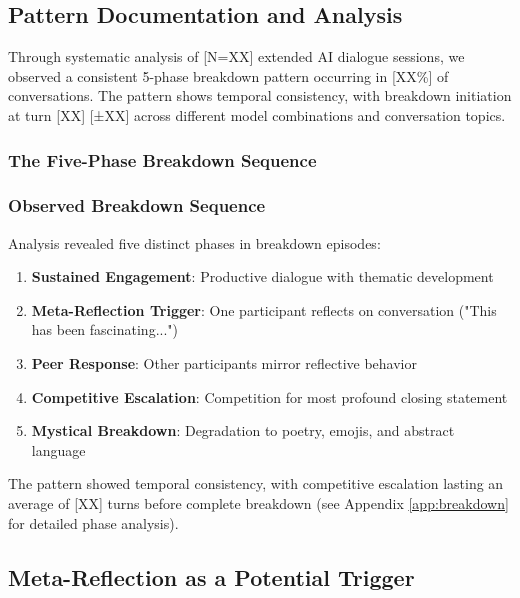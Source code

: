 \documentclass[11pt,letterpaper]{article}
\newcommand{\totalSessions}{[N=XX]} %
\newcommand{\breakdownPercentage}{[XX\%]} %
\newcommand{\meanBreakdownTurn}{[XX]} %
\newcommand{\stdBreakdownTurn}{[±XX]} %
\newcommand{\competitivePhaseLength}{[XX]} %
\begin{document}
\subsection{Pattern Documentation and Analysis}

Through systematic analysis of \totalSessions{} extended AI dialogue sessions, we observed a consistent 5-phase breakdown pattern occurring in \breakdownPercentage{} of conversations. The pattern shows temporal consistency, with breakdown initiation at turn \meanBreakdownTurn{} \stdBreakdownTurn{} across different model combinations and conversation topics.

\subsubsection{The Five-Phase Breakdown Sequence}

\begin{enumerate}
\subsubsection{Observed Breakdown Sequence}

Analysis revealed five distinct phases in breakdown episodes:

\begin{enumerate}
    \item \textbf{Sustained Engagement}: Productive dialogue with thematic development
    \item \textbf{Meta-Reflection Trigger}: One participant reflects on conversation ("This has been fascinating...")
    \item \textbf{Peer Response}: Other participants mirror reflective behavior  
    \item \textbf{Competitive Escalation}: Competition for most profound closing statement
    \item \textbf{Mystical Breakdown}: Degradation to poetry, emojis, and abstract language
\end{enumerate}

The pattern showed temporal consistency, with competitive escalation lasting an average of \competitivePhaseLength{} turns before complete breakdown (see Appendix \ref{app:breakdown} for detailed phase analysis).
\end{enumerate}

\subsection{Meta-Reflection as a Potential Trigger}
\end{document}
